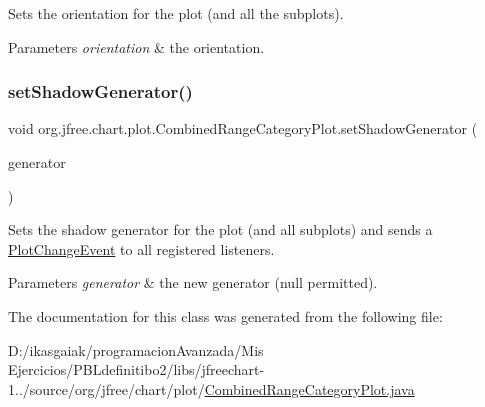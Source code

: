 Sets the orientation for the plot (and all the subplots).


\begin{DoxyParams}{Parameters}
{\em orientation} & the orientation. \\
\hline
\end{DoxyParams}
\mbox{\label{classorg_1_1jfree_1_1chart_1_1plot_1_1_combined_range_category_plot_aa517fa40f08864c0cba3b36a299b0c53}} 
\subsubsection{\texorpdfstring{set\+Shadow\+Generator()}{setShadowGenerator()}}
{\footnotesize\ttfamily void org.\+jfree.\+chart.\+plot.\+Combined\+Range\+Category\+Plot.\+set\+Shadow\+Generator (\begin{DoxyParamCaption}\item[{\mbox{\hyperlink{interfaceorg_1_1jfree_1_1chart_1_1util_1_1_shadow_generator}{Shadow\+Generator}}}]{generator }\end{DoxyParamCaption})}

Sets the shadow generator for the plot (and all subplots) and sends a \mbox{\hyperlink{}{Plot\+Change\+Event}} to all registered listeners.


\begin{DoxyParams}{Parameters}
{\em generator} & the new generator ({\ttfamily null} permitted). \\
\hline
\end{DoxyParams}


The documentation for this class was generated from the following file\+:\begin{DoxyCompactItemize}
\item 
D\+:/ikasgaiak/programacion\+Avanzada/\+Mis Ejercicios/\+P\+B\+Ldefinitibo2/libs/jfreechart-\/1../source/org/jfree/chart/plot/\mbox{\hyperlink{_combined_range_category_plot_8java}{Combined\+Range\+Category\+Plot.\+java}}\end{DoxyCompactItemize}
